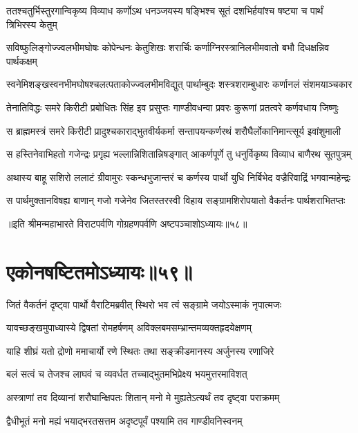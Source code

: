 \twolineshloka
{ततश्चतुर्भिस्तुरगान्विकृष्य विव्याध कर्णोऽथ धनञ्जयस्य}
{षङ्भिश्च सूतं दशभिर्हयांश्च षष्ट्या च पार्थं त्रिभिरस्य केतुम्}


\twolineshloka
{सविष्फुलिङ्गोज्ज्वलभीमघोषः कोपेन्धनः केतुशिखः शरार्चिः}
{कर्णाग्निरस्त्रानिलभीमवातो बभौ दिधक्षन्निव पार्थकक्षम्}


\twolineshloka
{स्वनेमिशङ्खस्वनभीमघोषश्चलत्पताकोज्ज्वलभीमविद्युत्}
{पार्थाम्बुदः शस्त्रशराम्बुधारः कर्णानलं संशमयाञ्चकार}


\twolineshloka
{तेनातिविद्धः समरे किरीटी प्रबोधितः सिंह इव प्रसुप्तः}
{गाण्डीवधन्वा प्रवरः कुरूणां प्रतत्वरे कर्णवधाय जिष्णुः}


\twolineshloka
{स ब्राह्ममस्त्रं समरे किरीटी प्रादुश्चकाराद्भुतवीर्यकर्मा}
{सन्तापयन्कर्णरथं शरौघैर्लोकानिमान्त्सूर्य इवांशुमाली}


\twolineshloka
{स हस्तिनेवाभिहतो गजेन्द्रः प्रगृह्य भल्लान्निशितान्निषङ्गात्}
{आकर्णपूर्णे तु धनुर्विकृष्य विव्याध बाणैरथ सूतपुत्रम्}


\twolineshloka
{अथास्य बाहू सशिरो ललाटं ग्रीवामुरः स्कन्धभुजान्तरं च}
{कर्णस्य पार्थो युधि निर्बिभेद वज्रैरिवाद्रिं भगवान्महेन्द्रः}


\twolineshloka
{स पार्थमुक्तानविषह्य बाणान् गजो गजेनेव जितस्तरस्वी}
{विहाय सङ्ग्रामशिरोपयातो वैकर्तनः पार्थशराभितप्तः}

॥इति श्रीमन्महाभारते विराटपर्वणि गोग्रहणपर्वणि अष्टपञ्चाशोऽध्यायः॥५८॥

\chapter{एकोनषष्टितमोऽध्यायः॥५९॥}

\twolineshloka
{जितं वैकर्तनं दृष्ट्वा पार्थो वैराटिमब्रवीत्}
{स्थिरो भव त्वं सङ्ग्रामे जयोऽस्माकं नृपात्मजः}


\twolineshloka
{यावच्छङ्खमुपाध्यास्ये द्विषतां रोमहर्षणम्}
{अविक्लबमसम्भ्रान्तमव्यक्तहृदयेक्षणम्}



\twolineshloka
{याहि शीघ्रं यतो द्रोणो ममाचार्यो रणे स्थितः}
{तथा सङ्क्रीडमानस्य अर्जुनस्य रणाजिरे}


\twolineshloka
{बलं सत्वं च तेजश्च लाघवं च व्यवर्धत}
{तच्चाद्भुतमभिप्रेक्ष्य भयमुत्तरमाविशत्}


\twolineshloka
{अस्त्राणां तव दिव्यानां शरौघान्क्षिपतः शितान्}
{मनो मे मुह्यतेऽत्यर्थं तव दृष्ट्वा पराक्रमम्}


\twolineshloka
{द्वैधीभूतं मनो मह्यं भयाद्भरतसत्तम}
{अदृष्टपूर्वं पश्यामि तव गाण्डीवनिस्वनम्}


